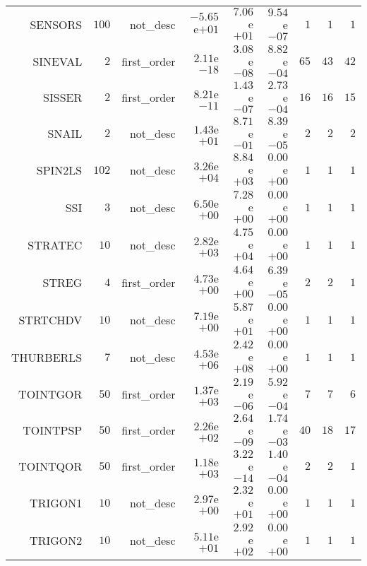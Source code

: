 \begin{longtable}{rrrrrrrrr}
SENSORS & \(   100\) & not\_desc & \(-5.65\)e\(+01\) & \( 7.06\)e\(+01\) & \( 9.54\)e\(-07\) & \(     1\) & \(     1\) & \(     1\) \\
SINEVAL & \(     2\) & first\_order & \( 2.11\)e\(-18\) & \( 3.08\)e\(-08\) & \( 8.82\)e\(-04\) & \(    65\) & \(    43\) & \(    42\) \\
SISSER & \(     2\) & first\_order & \( 8.21\)e\(-11\) & \( 1.43\)e\(-07\) & \( 2.73\)e\(-04\) & \(    16\) & \(    16\) & \(    15\) \\
SNAIL & \(     2\) & not\_desc & \( 1.43\)e\(+01\) & \( 8.71\)e\(-01\) & \( 8.39\)e\(-05\) & \(     2\) & \(     2\) & \(     2\) \\
SPIN2LS & \(   102\) & not\_desc & \( 3.26\)e\(+04\) & \( 8.84\)e\(+03\) & \( 0.00\)e\(+00\) & \(     1\) & \(     1\) & \(     1\) \\
SSI & \(     3\) & not\_desc & \( 6.50\)e\(+00\) & \( 7.28\)e\(+00\) & \( 0.00\)e\(+00\) & \(     1\) & \(     1\) & \(     1\) \\
STRATEC & \(    10\) & not\_desc & \( 2.82\)e\(+03\) & \( 4.75\)e\(+04\) & \( 0.00\)e\(+00\) & \(     1\) & \(     1\) & \(     1\) \\
STREG & \(     4\) & first\_order & \( 4.73\)e\(+00\) & \( 4.64\)e\(+00\) & \( 6.39\)e\(-05\) & \(     2\) & \(     2\) & \(     1\) \\
STRTCHDV & \(    10\) & not\_desc & \( 7.19\)e\(+00\) & \( 5.87\)e\(+01\) & \( 0.00\)e\(+00\) & \(     1\) & \(     1\) & \(     1\) \\
THURBERLS & \(     7\) & not\_desc & \( 4.53\)e\(+06\) & \( 2.42\)e\(+08\) & \( 0.00\)e\(+00\) & \(     1\) & \(     1\) & \(     1\) \\
TOINTGOR & \(    50\) & first\_order & \( 1.37\)e\(+03\) & \( 2.19\)e\(-06\) & \( 5.92\)e\(-04\) & \(     7\) & \(     7\) & \(     6\) \\
TOINTPSP & \(    50\) & first\_order & \( 2.26\)e\(+02\) & \( 2.64\)e\(-09\) & \( 1.74\)e\(-03\) & \(    40\) & \(    18\) & \(    17\) \\
TOINTQOR & \(    50\) & first\_order & \( 1.18\)e\(+03\) & \( 3.22\)e\(-14\) & \( 1.40\)e\(-04\) & \(     2\) & \(     2\) & \(     1\) \\
TRIGON1 & \(    10\) & not\_desc & \( 2.97\)e\(+00\) & \( 2.32\)e\(+01\) & \( 0.00\)e\(+00\) & \(     1\) & \(     1\) & \(     1\) \\
TRIGON2 & \(    10\) & not\_desc & \( 5.11\)e\(+01\) & \( 2.92\)e\(+02\) & \( 0.00\)e\(+00\) & \(     1\) & \(     1\) & \(     1\) \\

\end{longtable}
